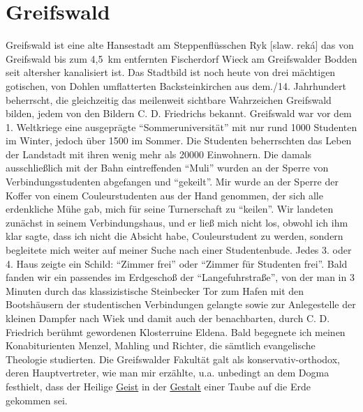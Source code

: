 \documentclass[a5paper,pagesize,10pt,twoside=true]{scrbook}
\begin{document}
\section{Greifswald}
Greifswald ist eine alte Hansestadt am Steppenflüsschen Ryk [slaw. reká] das von Greifswald bis zum 4,5~km entfernten Fischerdorf Wieck am Greifswalder Bodden seit altersher kanalisiert ist. Das Stadtbild ist noch heute von drei mächtigen gotischen, von Dohlen umflatterten Backsteinkirchen aus dem./14. Jahrhundert beherrscht, die gleichzeitig das meilenweit sichtbare Wahrzeichen Greifswald bilden, jedem von den Bildern C. D. Friedrichs bekannt. Greifswald war vor dem 1. Weltkriege eine ausgeprägte \enquote{Sommeruniversität} mit nur rund \num{1000} Studenten im Winter, jedoch über \num{1500} im Sommer. Die Studenten beherrschten das Leben der Landstadt mit ihren wenig mehr als \num{20000} Einwohnern. Die damals ausschließlich mit der Bahn eintreffenden \enquote{Muli} wurden an der Sperre von Verbindungsstudenten abgefangen und \enquote{gekeilt}. Mir wurde an der Sperre der Koffer von einem Couleurstudenten aus der Hand genommen, der sich alle erdenkliche Mühe gab, mich für seine Turnerschaft zu \enquote{keilen}. Wir landeten zunächst in seinem Verbindungshaus, und er ließ mich nicht los, obwohl ich ihm klar sagte, dass ich nicht die Absicht habe, Couleurstudent zu werden, sondern begleitete mich weiter auf meiner Suche nach einer Studentenbude. Jedes 3. oder 4. Haus zeigte ein Schild: \enquote{Zimmer frei} oder \enquote{Zimmer für Studenten frei}. Bald fanden wir ein passendes im Erdgeschoß der \enquote{Langefuhrstraße}, von der man in 3 Minuten durch das klassizistische Steinbecker Tor zum Hafen mit den Bootshäusern der studentischen Verbindungen gelangte sowie zur Anlegestelle der kleinen Dampfer nach Wiek und damit auch der benachbarten, durch C. D. Friedrich berühmt gewordenen Klosterruine Eldena. Bald begegnete ich meinen Konabiturienten Menzel, Mahling und Richter, die sämtlich evangelische Theologie studierten. Die Greifswalder Fakultät galt als konservativ-orthodox, deren Hauptvertreter, wie man mir erzählte, u.a. unbedingt an dem Dogma festhielt, dass der Heilige \underline{Geist} in der \underline{Gestalt} einer Taube auf die Erde gekommen sei.
\end{document}
